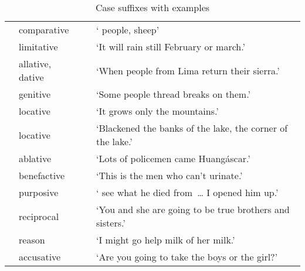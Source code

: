 \begin{table}[!ht]
\renewcommand*\arraystretch{1.1}
\small\centering
\caption{Case suffixes with examples}\label{Tab11}
\begin{tabularx}{\textwidth}{l@{\hspace{1ex}}l@{\hspace{1ex}}L@{\hspace{1ex}}L}
\lsptoprule
{} & comparative &  & ‘ people,  sheep’	\\
 & limitative &  & ‘It will rain still  February or march.’	\\
 & allative, \mbox{dative}&  & ‘When people from Lima return  their sierra.’ \\
 & genitive &  & ‘Some people thread breaks on them.’	\\
 & locative &  & ‘It grows only  the mountains.’	\\
 & locative &  & ‘Blackened  the banks of the lake,  the corner of the lake.’	\\
 & ablative &  & ‘Lots of policemen came  Huangáscar.’	\\
 & benefactive &  & ‘This is  the men who can’t urinate.’	\\
 & purposive &  & ‘ see what he died from~\dots{} I opened him up.’	\\
 & reciprocal &  & ‘You and she are going to be true brothers and sisters.’	\\
 & reason &  & ‘I might go help milk  of her milk.’	\\
 & accusative &  & ‘Are you going to take the boys or the girl?’	\\

\end{tabularx}
\end{table}
